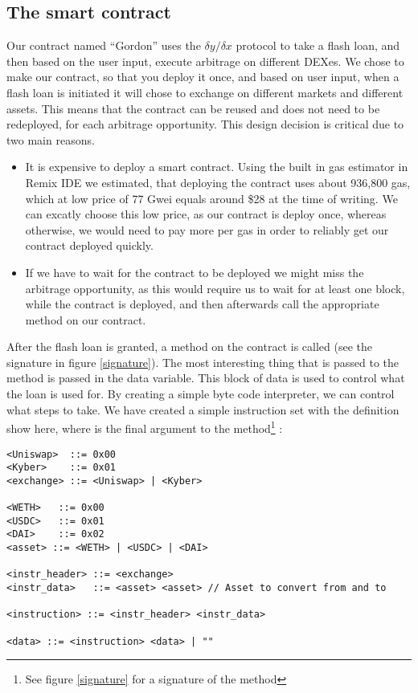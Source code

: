 \subsection{The smart contract}
Our contract named ``Gordon'' uses the $\delta y/\delta x$ protocol to take a
flash loan, and then based on the user input, execute arbitrage on different
DEXes. We chose to make our contract, so that you deploy it once, and based on
user input, when a flash loan is initiated it will chose to exchange on different
markets and different assets. This means that the contract can be reused and
does not need to be redeployed, for each arbitrage opportunity. This design
decision is critical due to two main reasons.
\begin{itemize}
    \item It is expensive to deploy a smart contract. Using the built in gas
        estimator in Remix IDE we estimated, that deploying the contract uses
        about 936,800 gas, which at low price of 77 Gwei equals around
        \$28 at the time of writing. We can excatly choose this low price, as
        our contract is deploy once, whereas otherwise, we would need to pay
        more per gas in order to reliably get our contract deployed quickly.
    \item If we have to wait for the contract to be deployed we might miss the
        arbitrage opportunity, as this would require us to wait for at least one
        block, while the contract is deployed, and then afterwards call the
        appropriate method on our contract.
\end{itemize}

\noindent After the flash loan is granted, a method on the contract is called
(see the signature in figure \ref{signature}). The most interesting thing that
is passed to the method is passed in the data variable. This block of data is
used to control what the loan is used for. By creating a simple byte code
interpreter, we can control what steps to take. We have created a simple
instruction set with the definition show here, where  is the final
argument to the method\footnote{See figure \ref{signature} for a signature of
the method} :

\begin{samepage}
\begin{verbatim}
<Uniswap>  ::= 0x00
<Kyber>    ::= 0x01
<exchange> ::= <Uniswap> | <Kyber>

<WETH>   ::= 0x00
<USDC>   ::= 0x01
<DAI>    ::= 0x02
<asset> ::= <WETH> | <USDC> | <DAI>

<instr_header> ::= <exchange>
<instr_data>   ::= <asset> <asset> // Asset to convert from and to

<instruction> ::= <instr_header> <instr_data>

<data> ::= <instruction> <data> | ""
\end{verbatim}
\end{samepage}

